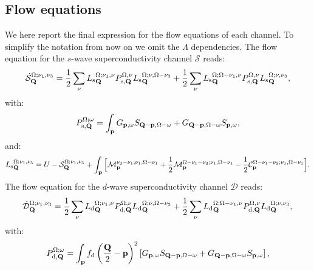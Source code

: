 \subsection{Flow equations}
\label{sec:FlowEquations}

We here report the final expression for the flow equations of each channel.
To simplify the notation from now on  we omit the $\Lambda$ dependencies.
The flow equation for the $s$-wave superconductivity channel $\mathcal{S}$ reads:
\begin{equation}
\dot{\mathcal{S}}_{\mathbf{Q}}^{\Omega;\nu_1,\nu_3} = 
  \frac{1}{2} \sum_{\nu}{L_\mathrm{s}}^{\Omega; \nu_1,\nu}_{\mathbf{Q}} P_{\mathrm{s},\mathbf{Q}}^{\Omega,\nu} {L_\mathrm{s}}^{\Omega; \nu,\Omega-\nu_3}_{\mathbf{Q}} 
+ \frac{1}{2} \sum_{\nu}{L_\mathrm{s}}^{\Omega; \Omega-\nu_1,\nu}_{\mathbf{Q}} P_{\mathrm{s},\mathbf{Q}}^{\Omega,\nu} {L_\mathrm{s}}^{\Omega; \nu,\nu_3}_{\mathbf{Q}},
\end{equation} 	   
with: 
\begin{equation}
P_{\mathrm{s},\mathbf{Q}}^{\Omega;\omega} = \int_{\mathbf{p}}  G_{\mathbf{p},\omega}S_{\mathbf{Q}-\mathbf{p},\Omega-\omega} +G_{\mathbf{Q}-\mathbf{p},\Omega-\omega}
S_{\mathbf{p},\omega}, 
\label{eq:app:P_pp}
\end{equation} 
and: 
\begin{align} 
\label{eq:Lswave}
{L_\mathrm{s}}^{\Omega;\nu_1,\nu_3}_{\mathbf{Q}}=U-\mathcal{S}_{\mathbf{Q}}^{\Omega;\nu_1,\nu_3}
+ \int_{\mathbf{p}}  \Big[ \mathcal{M}_{\mathbf{p}}^{\nu_3-\nu_1;\nu_1,\Omega-\nu_1} + \frac{1}{2} \mathcal{M}_{\mathbf{p}}^{\Omega-\nu_1-\nu_3;\nu_1,\Omega-\nu_1} - \frac{1}{2} \mathcal{C}_{\mathbf{p}}^{\Omega-\nu_1-\nu_3;\nu_1,\Omega-\nu_1} \Big]. 
\end{align}	 
The flow equation for the $d$-wave superconductivity channel  $\mathcal{D}$ reads:
\begin{equation}
\dot{\mathcal{D}}_{\mathbf{Q}}^{\Omega;\nu_1,\nu_3} = 
  \frac{1}{2} \sum_{\nu}{L_\mathrm{d}}^{\Omega; \nu_1,\nu}_{\mathbf{Q}} P_{\mathrm{d},\mathbf{Q}}^{\Omega,\nu} {L_\mathrm{d}}^{\Omega; \nu,\Omega-\nu_3}_{\mathbf{Q}} 
+ \frac{1}{2} \sum_{\nu}{L_\mathrm{d}}^{\Omega; \Omega-\nu_1,\nu}_{\mathbf{Q}} P_{\mathrm{d},\mathbf{Q}}^{\Omega,\nu} {L_\mathrm{d}}^{\Omega; \nu,\nu_3}_{\mathbf{Q}},
\label{eq:dwaveflow}
\end{equation}
with: 
\begin{equation}
P_{\mathrm{d},\mathbf{Q}}^{\Omega;\omega} = \int_{\mathbf{p}}  f_{\mathrm{d}}\left(\frac{\mathbf{Q}}{2}-\mathbf{p}\right)^2 \left[ G_{\mathbf{p},\omega}S_{\mathbf{Q}-\mathbf{p},\Omega-\omega} +G_{\mathbf{Q}-\mathbf{p},\Omega-\omega}
S_{\mathbf{p},\omega} \right], 
\label{eq:app:P_pp}
\end{equation} 
